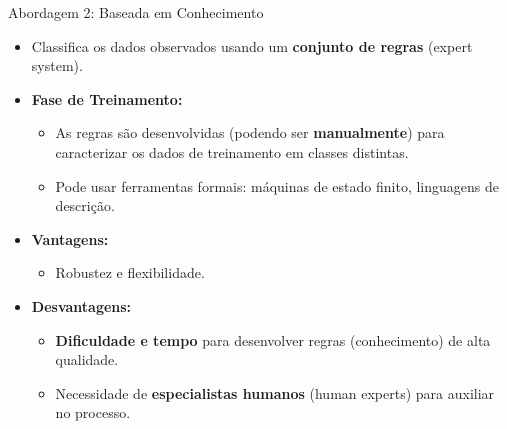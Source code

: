 \begin{frame}{Abordagem 2: Baseada em Conhecimento}
    \begin{itemize}
        \item Classifica os dados observados usando um \textbf{conjunto de regras} (expert system).

        \item \textbf{Fase de Treinamento:}
              \begin{itemize}
                  \item As regras são desenvolvidas (podendo ser \textbf{manualmente}) para caracterizar os dados de treinamento em classes distintas.
                  \item Pode usar ferramentas formais: máquinas de estado finito, linguagens de descrição.
              \end{itemize}

        \item \textbf{Vantagens:}
              \begin{itemize}
                  \item Robustez e flexibilidade.
              \end{itemize}

        \item \textbf{Desvantagens:}
              \begin{itemize}
                  \item \textbf{Dificuldade e tempo} para desenvolver regras (conhecimento) de alta qualidade.
                  \item Necessidade de \textbf{especialistas humanos} (human experts) para auxiliar no processo.
              \end{itemize}
    \end{itemize}
\end{frame}

